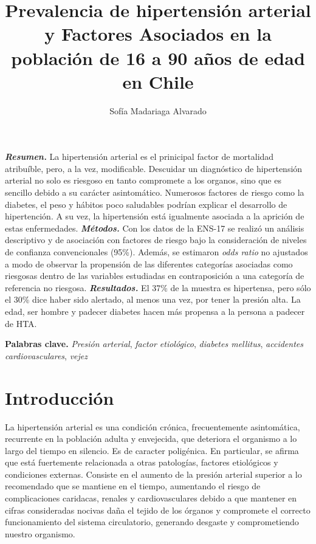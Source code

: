 \documentclass{aa}
\begin{document}
\title{Prevalencia de hipertensión arterial y Factores Asociados  en la población de 16 a 90 años de edad en Chile}
\author{Sofía Madariaga Alvarado}

\abstract
{\textbf{\textit{Resumen.}} La hipertensión arterial es el prinicipal factor de mortalidad atribuíble, pero, a la vez, modificable. Descuidar un diagnóstico de hipertensión arterial no solo es riesgoso en tanto compromete a los organos, sino que es sencillo debido a su carácter asintomático. Numerosos factores de riesgo como la diabetes, el peso y hábitos poco saludables podrían explicar el desarrollo de hipertención. A su vez, la hipertensión está igualmente asociada a la aprición de estas enfermedades. \textbf{\textit{Métodos.}} Con los datos de la ENS-17 se realizó un análisis descriptivo y de asociación con factores de riesgo bajo la consideración de niveles de confianza convencionales (95\%). Además, se estimaron \textit{odds ratio} no ajustados a modo de observar la propensión de las diferentes categorías asociadas como riesgosas dentro de las variables estudiadas en contraposición a una categoría de referencia no riesgosa. \textbf{\textit{Resultados.}} El 37\% de la muestra es hipertensa, pero sólo el 30\% dice haber sido alertado, al menos una vez, por tener la presión alta. La edad, ser hombre y padecer diabetes hacen más propensa a la persona a padecer de HTA.
\tiny

\textbf{Palabras clave.} \textit{Presión arterial}, \textit{factor etiológico}, \textit{diabetes mellitus}, \textit{accidentes cardiovasculares}, \textit{vejez}
}

\maketitle

\section{Introducción}

La hipertensión arterial es una condición crónica, frecuentemente asintomática, recurrente en la población adulta y envejecida, que deteriora el organismo a lo largo del tiempo en silencio. Es de caracter poligénica. En particular, se afirma que está fuertemente relacionada a otras patologías, factores etiológicos y condiciones externas. Consiste en el aumento de la presión arterial superior a lo recomendado que se mantiene en el tiempo, aumentando el riesgo de complicaciones caridacas, renales y cardiovasculares debido a que mantener en cifras consideradas nocivas daña el tejido de los órganos y compromete el correcto funcionamiento del sistema circulatorio, generando desgaste y comprometiendo nuestro organismo.
\end{document}
